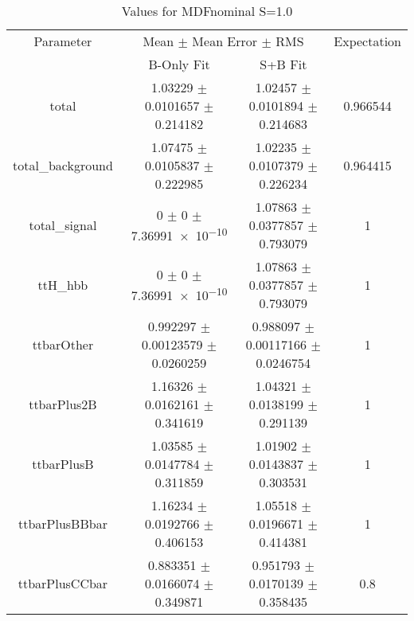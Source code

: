 \begin{table}
\centering
\caption{Values for MDFnominal S=1.0}
\begin{tabular}{cccc}
\toprule
Parameter & \multicolumn{2}{c}{Mean $\pm$ Mean Error $\pm$ RMS} & Expectation\\
 & B-Only Fit & S+B Fit & \\
\midrule
total & \num{1.03229} $\pm$ \num{0.0101657} $\pm$ \num{0.214182} & \num{1.02457} $\pm$ \num{0.0101894} $\pm$ \num{0.214683} & \num{0.966544}\\
total\_background & \num{1.07475} $\pm$ \num{0.0105837} $\pm$ \num{0.222985} & \num{1.02235} $\pm$ \num{0.0107379} $\pm$ \num{0.226234} & \num{0.964415}\\
total\_signal & \num{0} $\pm$ \num{0} $\pm$ \num{7.36991e-10} & \num{1.07863} $\pm$ \num{0.0377857} $\pm$ \num{0.793079} & \num{1}\\
ttH\_hbb & \num{0} $\pm$ \num{0} $\pm$ \num{7.36991e-10} & \num{1.07863} $\pm$ \num{0.0377857} $\pm$ \num{0.793079} & \num{1}\\
ttbarOther & \num{0.992297} $\pm$ \num{0.00123579} $\pm$ \num{0.0260259} & \num{0.988097} $\pm$ \num{0.00117166} $\pm$ \num{0.0246754} & \num{1}\\
ttbarPlus2B & \num{1.16326} $\pm$ \num{0.0162161} $\pm$ \num{0.341619} & \num{1.04321} $\pm$ \num{0.0138199} $\pm$ \num{0.291139} & \num{1}\\
ttbarPlusB & \num{1.03585} $\pm$ \num{0.0147784} $\pm$ \num{0.311859} & \num{1.01902} $\pm$ \num{0.0143837} $\pm$ \num{0.303531} & \num{1}\\
ttbarPlusBBbar & \num{1.16234} $\pm$ \num{0.0192766} $\pm$ \num{0.406153} & \num{1.05518} $\pm$ \num{0.0196671} $\pm$ \num{0.414381} & \num{1}\\
ttbarPlusCCbar & \num{0.883351} $\pm$ \num{0.0166074} $\pm$ \num{0.349871} & \num{0.951793} $\pm$ \num{0.0170139} $\pm$ \num{0.358435} & \num{0.8}\\
\bottomrule
\end{tabular}
\end{table}